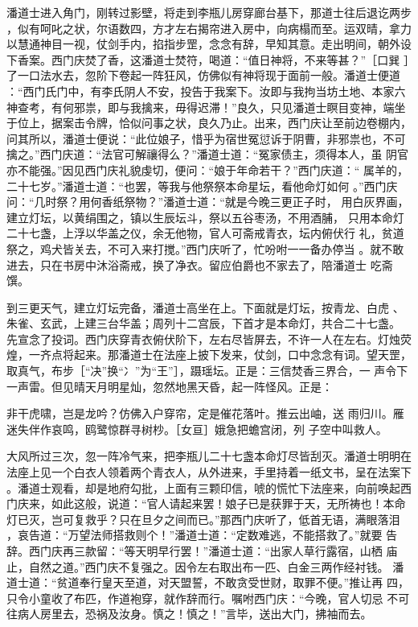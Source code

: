 潘道士进入角门，刚转过影壁，将走到李瓶儿房穿廊台基下，那道士往后退讫两步
，似有呵叱之状，尔语数四，方才左右揭帘进入房中，向病榻而至。运双晴，拿力
以慧通神目一视，仗剑手内，掐指步罡，念念有辞，早知其意。走出明间，朝外设
下香案。西门庆焚了香，这潘道士焚符，喝道：“值日神将，不来等甚？”［口巽
］了一口法水去，忽阶下卷起一阵狂风，仿佛似有神将现于面前一般。潘道士便道
：“西门氏门中，有李氏阴人不安，投告于我案下。汝即与我拘当坊土地、本家六
神查考，有何邪祟，即与我擒来，毋得迟滞！”良久，只见潘道士瞑目变神，端坐
于位上，据案击令牌，恰似问事之状，良久乃止。出来，西门庆让至前边卷棚内，
问其所以，潘道士便说：“此位娘子，惜乎为宿世冤愆诉于阴曹，非邪祟也，不可
擒之。”西门庆道：“法官可解禳得么？”潘道士道：“冤家债主，须得本人，虽
阴官亦不能强。”因见西门庆礼貌虔切，便问：“娘于年命若干？”西门庆道：“
属羊的，二十七岁。”潘道士道：“也罢，等我与他祭祭本命星坛，看他命灯如何
。”西门庆问：“几时祭？用何香纸祭物？”潘道士道：“就是今晚三更正子时，
用白灰界画，建立灯坛，以黄绢围之，镇以生辰坛斗，祭以五谷枣汤，不用酒脯，
只用本命灯二十七盏，上浮以华盖之仪，余无他物，官人可斋戒青衣，坛内俯伏行
礼，贫道祭之，鸡犬皆关去，不可入来打搅。”西门庆听了，忙吩咐一一备办停当
。就不敢进去，只在书房中沐浴斋戒，换了净衣。留应伯爵也不家去了，陪潘道士
吃斋馔。

到三更天气，建立灯坛完备，潘道士高坐在上。下面就是灯坛，按青龙、白虎
、朱雀、玄武，上建三台华盖；周列十二宫辰，下首才是本命灯，共合二十七盏。
先宣念了投词。西门庆穿青衣俯伏阶下，左右尽皆屏去，不许一人在左右。灯烛荧
煌，一齐点将起来。那潘道士在法座上披下发来，仗剑，口中念念有词。望天罡，
取真气，布步［“决”换“冫”为“王”］，蹑瑶坛。正是：三信焚香三界合，一
声令下一声雷。但见晴天月明星灿，忽然地黑天昏，起一阵怪风。正是：

非干虎啸，岂是龙吟？仿佛入户穿帘，定是催花落叶。推云出岫，送
雨归川。雁迷失伴作哀鸣，鸥鹭惊群寻树杪。［女亘］娥急把蟾宫闭，列
子空中叫救人。

大风所过三次，忽一阵冷气来，把李瓶儿二十七盏本命灯尽皆刮灭。潘道士明明在
法座上见一个白衣人领着两个青衣人，从外进来，手里持着一纸文书，呈在法案下
。潘道士观看，却是地府勾批，上面有三颗印信，唬的慌忙下法座来，向前唤起西
门庆来，如此这般，说道：“官人请起来罢！娘子已是获罪于天，无所祷也！本命
灯已灭，岂可复救乎？只在旦夕之间而已。”那西门庆听了，低首无语，满眼落泪
，哀告道：“万望法师搭救则个！”潘道士道：“定数难逃，不能搭救了。”就要
告辞。西门庆再三款留：“等天明早行罢！”潘道士道：“出家人草行露宿，山栖
庙止，自然之道。”西门庆不复强之。因令左右取出布一匹、白金三两作经衬钱。
潘道士道：“贫道奉行皇天至道，对天盟誓，不敢贪受世财，取罪不便。”推让再
四，只令小童收了布匹，作道袍穿，就作辞而行。嘱咐西门庆：“今晚，官人切忌
不可往病人房里去，恐祸及汝身。慎之！慎之！”言毕，送出大门，拂袖而去。

